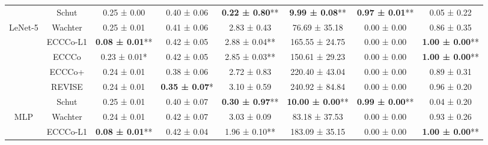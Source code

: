 \begin{table}
{\begin{tabular}[t]{cccccccc}
 & Schut & 0.25 ± 0.00\hphantom{*}\hphantom{*} & 0.40 ± 0.06\hphantom{*}\hphantom{*} & \textbf{0.22 ± 0.80}** & \textbf{9.99 ± 0.08}** & \textbf{0.97 ± 0.01}** & 0.05 ± 0.22\hphantom{*}\hphantom{*}\\

\multirow[t]{-6}{*}{\centering\arraybackslash LeNet-5} & Wachter & 0.25 ± 0.01\hphantom{*}\hphantom{*} & 0.41 ± 0.06\hphantom{*}\hphantom{*} & 2.83 ± 0.43\hphantom{*}\hphantom{*} & 76.69 ± 35.18\hphantom{*}\hphantom{*} & 0.00 ± 0.00\hphantom{*}\hphantom{*} & 0.86 ± 0.35\hphantom{*}\hphantom{*}\\
\cmidrule{1-8}
 & ECCCo-L1 & \textbf{0.08 ± 0.01}** & 0.42 ± 0.05\hphantom{*}\hphantom{*} & 2.88 ± 0.04** & 165.55 ± 24.75\hphantom{*}\hphantom{*} & 0.00 ± 0.00\hphantom{*}\hphantom{*} & \textbf{1.00 ± 0.00}**\\

 & ECCCo & 0.23 ± 0.01*\hphantom{*} & 0.42 ± 0.05\hphantom{*}\hphantom{*} & 2.85 ± 0.03** & 150.61 ± 29.23\hphantom{*}\hphantom{*} & 0.00 ± 0.00\hphantom{*}\hphantom{*} & \textbf{1.00 ± 0.00}**\\

 & ECCCo+ & 0.24 ± 0.01\hphantom{*}\hphantom{*} & 0.38 ± 0.06\hphantom{*}\hphantom{*} & 2.72 ± 0.83\hphantom{*}\hphantom{*} & 220.40 ± 43.04\hphantom{*}\hphantom{*} & 0.00 ± 0.00\hphantom{*}\hphantom{*} & 0.89 ± 0.31\hphantom{*}\hphantom{*}\\

 & REVISE & 0.24 ± 0.01\hphantom{*}\hphantom{*} & \textbf{0.35 ± 0.07}*\hphantom{*} & 3.10 ± 0.59\hphantom{*}\hphantom{*} & 240.92 ± 84.84\hphantom{*}\hphantom{*} & 0.00 ± 0.00\hphantom{*}\hphantom{*} & 0.96 ± 0.20\hphantom{*}\hphantom{*}\\

 & Schut & 0.25 ± 0.01\hphantom{*}\hphantom{*} & 0.40 ± 0.07\hphantom{*}\hphantom{*} & \textbf{0.30 ± 0.97}** & \textbf{10.00 ± 0.00}** & \textbf{0.99 ± 0.00}** & 0.04 ± 0.20\hphantom{*}\hphantom{*}\\

\multirow[t]{-6}{*}{\centering\arraybackslash MLP} & Wachter & 0.24 ± 0.01\hphantom{*}\hphantom{*} & 0.42 ± 0.07\hphantom{*}\hphantom{*} & 3.03 ± 0.09\hphantom{*}\hphantom{*} & 83.18 ± 37.53\hphantom{*}\hphantom{*} & 0.00 ± 0.00\hphantom{*}\hphantom{*} & 0.93 ± 0.26\hphantom{*}\hphantom{*}\\
\cmidrule{1-8}
 & ECCCo-L1 & \textbf{0.08 ± 0.01}** & 0.42 ± 0.04\hphantom{*}\hphantom{*} & 1.96 ± 0.10** & 183.09 ± 35.15\hphantom{*}\hphantom{*} & 0.00 ± 0.00\hphantom{*}\hphantom{*} & \textbf{1.00 ± 0.00}**\\


\end{tabular}}
\end{table}
